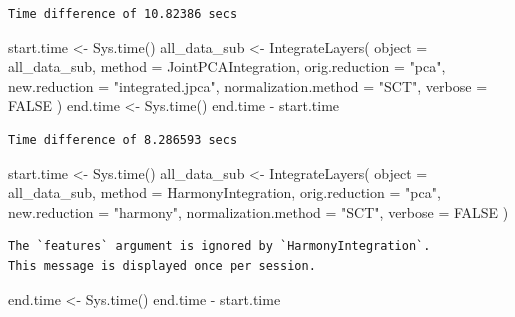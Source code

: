 \documentclass[
  letterpaper,
  DIV=11,
  numbers=noendperiod]{scrreprt}
\newenvironment{Shaded}{\begin{snugshade}}{\end{snugshade}}
\newcommand{\AttributeTok}[1]{\textcolor[rgb]{0.40,0.45,0.13}{#1}}
\newcommand{\ConstantTok}[1]{\textcolor[rgb]{0.56,0.35,0.01}{#1}}
\newcommand{\FunctionTok}[1]{\textcolor[rgb]{0.28,0.35,0.67}{#1}}
\newcommand{\NormalTok}[1]{\textcolor[rgb]{0.00,0.23,0.31}{#1}}
\newcommand{\OtherTok}[1]{\textcolor[rgb]{0.00,0.23,0.31}{#1}}
\newcommand{\SpecialCharTok}[1]{\textcolor[rgb]{0.37,0.37,0.37}{#1}}
\newcommand{\StringTok}[1]{\textcolor[rgb]{0.13,0.47,0.30}{#1}}
\begin{document}
\begin{verbatim}
Time difference of 10.82386 secs
\end{verbatim}

\begin{Shaded}
\begin{Highlighting}[]
\NormalTok{start.time }\OtherTok{\textless{}{-}} \FunctionTok{Sys.time}\NormalTok{()}
\NormalTok{all\_data\_sub }\OtherTok{\textless{}{-}} \FunctionTok{IntegrateLayers}\NormalTok{(}
  \AttributeTok{object =}\NormalTok{ all\_data\_sub, }\AttributeTok{method =}\NormalTok{ JointPCAIntegration,}
  \AttributeTok{orig.reduction =} \StringTok{"pca"}\NormalTok{, }\AttributeTok{new.reduction =} \StringTok{"integrated.jpca"}\NormalTok{, }\AttributeTok{normalization.method =} \StringTok{"SCT"}\NormalTok{,}
  \AttributeTok{verbose =} \ConstantTok{FALSE}
\NormalTok{)}
\NormalTok{end.time }\OtherTok{\textless{}{-}} \FunctionTok{Sys.time}\NormalTok{()}
\NormalTok{end.time }\SpecialCharTok{{-}}\NormalTok{ start.time}
\end{Highlighting}
\end{Shaded}

\begin{verbatim}
Time difference of 8.286593 secs
\end{verbatim}

\begin{Shaded}
\begin{Highlighting}[]
\NormalTok{start.time }\OtherTok{\textless{}{-}} \FunctionTok{Sys.time}\NormalTok{()}
\NormalTok{all\_data\_sub }\OtherTok{\textless{}{-}} \FunctionTok{IntegrateLayers}\NormalTok{(}
  \AttributeTok{object =}\NormalTok{ all\_data\_sub, }\AttributeTok{method =}\NormalTok{ HarmonyIntegration,}
  \AttributeTok{orig.reduction =} \StringTok{"pca"}\NormalTok{, }\AttributeTok{new.reduction =} \StringTok{"harmony"}\NormalTok{, }\AttributeTok{normalization.method =} \StringTok{"SCT"}\NormalTok{,}
  \AttributeTok{verbose =} \ConstantTok{FALSE}
\NormalTok{)}
\end{Highlighting}
\end{Shaded}

\begin{verbatim}
The `features` argument is ignored by `HarmonyIntegration`.
This message is displayed once per session.
\end{verbatim}

\begin{Shaded}
\begin{Highlighting}[]
\NormalTok{end.time }\OtherTok{\textless{}{-}} \FunctionTok{Sys.time}\NormalTok{()}
\NormalTok{end.time }\SpecialCharTok{{-}}\NormalTok{ start.time}
\end{Highlighting}
\end{Shaded}
\end{document}

